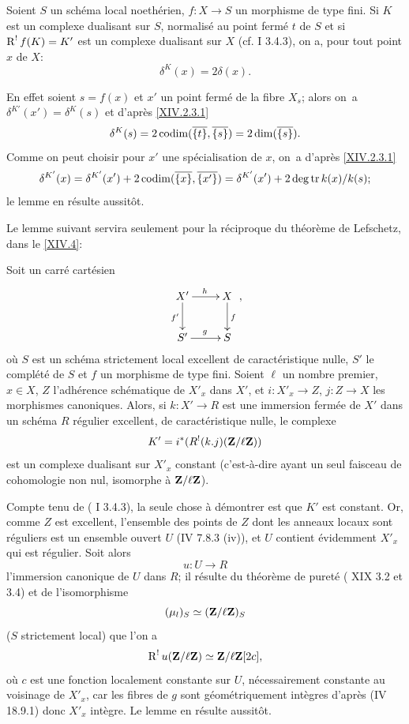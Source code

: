 \begin{sublemme} \label{XIV.2.3.2} Soient $S$ un sch\'ema local noeth\'erien, $f:X\to S$ un morphisme de type fini. Si $K$ est un complexe dualisant sur $S$, normalis\'e au point ferm\'e $t$ de $S$ et si $\operatorname{R}^!f(K)=K'$ est un complexe dualisant sur $X$ (cf.  I 3.4.3), on a, pour tout point $x$ de $X$:$$
\delta^{K}(x)=2\delta(x).
$$
\end{sublemme}

En effet soient $s=f(x)$ et $x'$ un point ferm\'e de la fibre $X_s$; alors on~a $\delta^{K'}(x')=\delta^K(s)$ et d'apr\`es \ref{XIV.2.3.1}
$$
\delta^K(s)=2\operatorname{codim}(\overline{\{t\}}, \overline{\{s\}})=2\dim(\overline{\{s\}}).
$$
Comme on peut choisir pour $x'$ une sp\'ecialisation de $x$, on~a d'apr\`es \ref{XIV.2.3.1}
$$
\delta^{K'}(x)=\delta^{K'}(x')+2\operatorname{codim}(\overline{\{x\}}, \overline{\{x'\}})=\delta^{K'}(x')+2\operatorname{deg\,tr} k(x)/k(s);$$
le lemme en r\'esulte aussit\^{o}t.

Le lemme suivant servira seulement pour la r\'eciproque du th\'eor\`eme de Lefschetz, dans le \numero\ref{XIV.4}:

\begin{sublemme} \label{XIV.2.3.3}
Soit un carr\'e cart\'esien
$$
\xymatrix{X^{\prime}\ar[r]^{h}\ar[d]_{f^{\prime}}&X\ar[d]^f\\S^{\prime}\ar[r]^g&S},
$$
o\`u $S$ est un sch\'ema strictement local excellent de caract\'eristique nulle, $S'$ le compl\'et\'e de $S$ et $f$ un morphisme de type fini. Soient $\ell$ un nombre premier, $x\in X$, $Z$ l'adh\'erence sch\'ematique de $X'_x$ dans $X'$, et $i:X'_x\to Z$, $j:Z\to X$ les morphismes canoniques. Alors, si $k:X'\to R$ est une immersion ferm\'ee de $X'$ dans un sch\'ema $R$ r\'egulier excellent, de caract\'eristique nulle, le complexe
$$K'=i^*(R^!(k.j)(\mathbf{Z}/\ell\mathbf{Z}))$$
est un complexe dualisant sur $X'_x$ constant (c'est-\`a-dire ayant un seul faisceau de cohomologie non nul, isomorphe \`a $\mathbf{Z}/\ell\mathbf{Z}$).
\end{sublemme}

\enlargethispage{\baselineskip}%
Compte tenu de ( I 3.4.3), la seule chose \`a d\'emontrer est que $K'$ est constant. Or, comme $Z$ est excellent, l'ensemble des points de $Z$ dont les anneaux locaux sont r\'eguliers est un ensemble ouvert $U$ (\EGA IV 7.8.3 \textup{(iv)}), et $U$ contient \'evidemment $X'_x$ qui est r\'egulier. Soit alors
$$u:U\to R$$
l'immersion canonique de $U$ dans $R$; il r\'esulte du th\'eor\`eme de puret\'e ( XIX 3.2 et 3.4) et de l'isomorphisme
$$(\mu_l)_S\simeq(\mathbf{Z}/\ell\mathbf{Z})_S$$
($S$ strictement local) que l'on a
$$
\operatorname{R}^!u(\mathbf{Z}/\ell\mathbf{Z})\simeq\mathbf{Z}/\ell\mathbf{Z}[2c],
$$
o\`u $c$ est une fonction localement constante sur $U$, n\'ecessairement constante au voisinage de $X'_x$, car les fibres de $g$ sont g\'eom\'etriquement int\`egres d'apr\`es (\EGA IV 18.9.1) donc $X'_x$ int\`egre. Le lemme en r\'esulte aussit\^{o}t.

